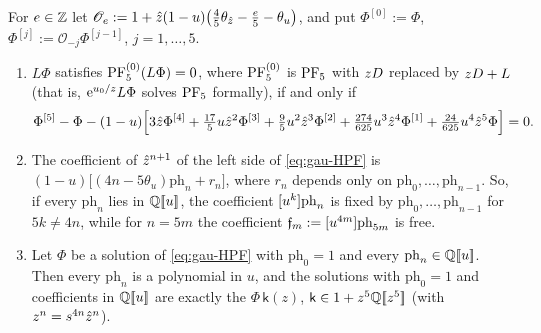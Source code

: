\begin{lem}
\label{lem:gau-HPF}
For $e\in\mathbb{Z}$ let $\mathscr O_e:=1+\hat{z}(1-u)\bigl(\tfrac45\theta_{\hat{z}}-\tfrac e5-\theta_u\bigr)$, and put $\Phi^{[0]}:=\Phi$, $\Phi^{[j]}:=\mathscr O_{-j}\Phi^{[j-1]}$, $j=1,\dots,5$.
\begin{enumerate}
\item $L\Phi$ satisfies $\mathrm{PF}_{5}^{(0)}(L\Phi)=0$, where $\mathrm{PF}_{5}^{(0)}$ is $\mathrm{PF}_{5}$ with $zD$ replaced by $zD+L$ (that is, $\mathrm{e}^{u_0/z}L\Phi$ solves $\mathrm{PF}_{5}$ formally), if and only if
\begin{equation}
\label{eq:gau-HPF}
\Phi^{[5]}-\Phi-(1-u)\Bigl[3\hat{z}\Phi^{[4]}+\tfrac{17}5u\hat{z}^2\Phi^{[3]}+\tfrac95u^2\hat{z}^3\Phi^{[2]}+\tfrac{274}{625}u^3\hat{z}^4\Phi^{[1]}+\tfrac{24}{625}u^4\hat{z}^5\Phi\Bigr]=0 .
\end{equation}
\item The coefficient of $\hat{z}^{n+1}$ of the left side of \eqref{eq:gau-HPF} is $(1-u)\bigl[(4n-5\theta_u)\mathrm{ph}_n+r_n\bigr]$, where $r_n$ depends only on $\mathrm{ph}_0,\dots,\mathrm{ph}_{n-1}$. So, if every $\mathrm{ph}_n$ lies in $\mathbb{Q}[\![ u ]\!]$, the coefficient $[u^k]\mathrm{ph}_n$ is fixed by $\mathrm{ph}_0,\dots,\mathrm{ph}_{n-1}$ for $5k\neq4n$, while for $n=5m$ the coefficient $\mathfrak{f}_m:=[u^{4m}]\mathrm{ph}_{5m}$ is free.
\item Let $\Phi$ be a solution of \eqref{eq:gau-HPF} with $\mathrm{ph}_0=1$ and every $\mathrm{ph}_n\in\mathbb{Q}[\![ u ]\!]$. Then every $\mathrm{ph}_n$ is a polynomial in $u$, and the solutions with $\mathrm{ph}_0=1$ and coefficients in $\mathbb{Q}[\![ u ]\!]$ are exactly the $\Phi\,\mathsf k(z)$, $\mathsf k\in1+z^5\mathbb{Q}[\![ z^5 ]\!]$ (with $z^n=s^{4n}\hat{z}^n$).
\end{enumerate}
\end{lem}

